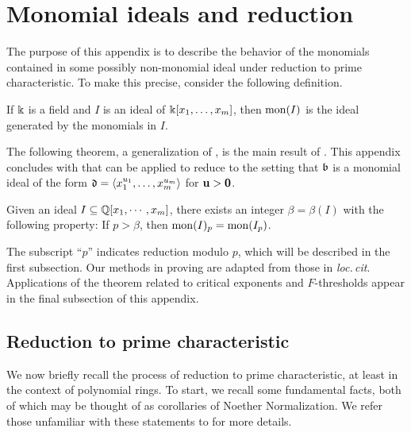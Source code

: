 \documentclass[11pt]{amsart}
\begin{document}
\newpage
\appendix

\section{Monomial ideals and reduction}
\label{monomial-reduction: A}

The purpose of this appendix is to describe the behavior of the monomials contained in some possibly non-monomial ideal under reduction to prime characteristic.  To make this precise, consider the following definition. 

\begin{definition}
If $\Bbbk$ is a field and $I$ is an ideal of $\Bbbk[x_1, \ldots, x_m]$, then $\operatorname{mon}(I)$ is the ideal generated by the monomials in $I$. %
\end{definition}

The following theorem, a generalization of \cite[Lemma 6.1]{budur+mustata+saito.roots_bs_polys_monomial}, is the main result of . This appendix concludes with  that can be applied to reduce  to the setting that $\mathfrak{b}$ is a monomial ideal of the form $\mathfrak{d} = \langle x_1^{u_1}, \ldots, x_m^{u_m} \rangle$ for $\mathbf{u} > \mathbf{0}$.


\begin{theorem}
\label{mon-operation-modulo-p: T}
Given an ideal $I \subseteq \mathbb{Q}[x_1, \cdots, x_m]$, there exists an integer $\beta = \beta(I)$ with the following property:  If $p > \beta$, then $\operatorname{mon}(I)_p = \operatorname{mon}(I_p)$.
\end{theorem}

The subscript ``$p$'' indicates reduction modulo $p$, which will be described in the first subsection. 
Our methods in proving  are adapted from those in \emph{loc.\,cit}.
Applications of the theorem related to critical exponents and $F$-thresholds 
appear in the final subsection of this appendix. 


\newpage

\subsection{Reduction to prime characteristic}

\newcommand{\maxi}{\mathfrak{m}}

We now briefly recall the process of reduction to prime characteristic, at least in the context of polynomial rings.  To start, we recall some fundamental facts, both of which may be thought of as corollaries of Noether Normalization.  We refer those unfamiliar
with these statements to \cite[Chapter 3]{hernandez.thesis} for more details.
\end{document}
